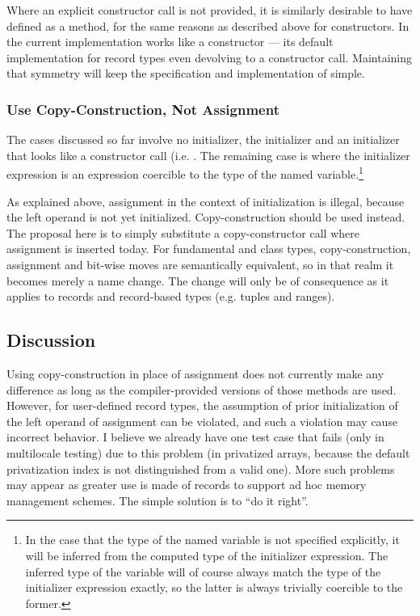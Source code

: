 Where an explicit constructor call is not provided, it is similarly desirable to have
 defined as a method, for the same reasons as described above for
constructors.  In the current implementation  works like a constructor
--- its default implementation for record types even devolving to a constructor call.
Maintaining that symmetry will keep the specification and implementation of
 simple.

\subsubsection{Use Copy-Construction, Not Assignment}

The cases discussed so far involve no initializer, the  initializer and an
initializer that looks like a constructor call (i.e. .  The remaining
case is where the initializer expression is an expression coercible to the type of the
named variable.\footnote{In the case that the type of the named variable is not specified
  explicitly, it will be inferred from the computed type of the initializer expression.
  The inferred type of the variable will of course always match the type of the
  initializer expression exactly, so the latter is always trivially coercible to the
  former.}

As explained above, assignment in the context of initialization is illegal, because the
left operand is not yet initialized.  Copy-construction should be used instead.  The
proposal here is to simply substitute a copy-constructor call where assignment is inserted
today.  For fundamental and class types, copy-construction, assignment and bit-wise moves are
semantically equivalent, so in that realm it becomes merely a name change.  The change
will only be of consequence as it applies to records and record-based types (e.g. tuples
and ranges).

\subsection{Discussion}

Using copy-construction in place of assignment does not currently make any difference as
long as the compiler-provided versions of those methods are used.  However, for
user-defined record types, the assumption of prior initialization of the left operand of
assignment can be violated, and such a violation may cause incorrect behavior.  I believe
we already have one test case that fails (only in multilocale testing) due to this
problem (in privatized arrays, because the default privatization index is not distinguished
from a valid one).  More such problems may appear as greater use is made of records to
support ad hoc memory management schemes.  The simple solution is to ``do it
right''.

